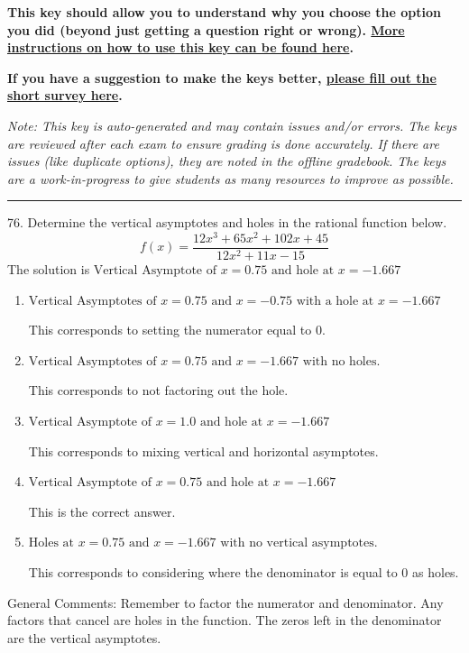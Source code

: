 \documentclass{extbook}[14pt]
\begin{document}
\textbf{This key should allow you to understand why you choose the option you did (beyond just getting a question right or wrong). \href{https://xronos.clas.ufl.edu/mac1105spring2020/courseDescriptionAndMisc/Exams/LearningFromResults}{More instructions on how to use this key can be found here}.}

\textbf{If you have a suggestion to make the keys better, \href{https://forms.gle/CZkbZmPbC9XALEE88}{please fill out the short survey here}.}

\textit{Note: This key is auto-generated and may contain issues and/or errors. The keys are reviewed after each exam to ensure grading is done accurately. If there are issues (like duplicate options), they are noted in the offline gradebook. The keys are a work-in-progress to give students as many resources to improve as possible.}

\rule{\textwidth}{0.4pt}

76. Determine the vertical asymptotes and holes in the rational function below.
\[ f(x) = \frac{12x^{3} +65 x^{2} +102 x + 45}{12x^{2} +11 x -15} \] 
The solution is $ \text{Vertical Asymptote of } x = 0.75 \text{ and hole at } x = -1.667 $ 

\begin{enumerate}[label=\Alph*.] 
\item $ \text{Vertical Asymptotes of } x = 0.75 \text{ and } x = -0.75 \text{ with a hole at } x = -1.667 $ 

 This corresponds to setting the numerator equal to 0. 
\item $ \text{Vertical Asymptotes of } x = 0.75 \text{ and } x = -1.667 \text{ with no holes.} $ 

 This corresponds to not factoring out the hole. 
\item $ \text{Vertical Asymptote of } x = 1.0 \text{ and hole at } x = -1.667 $ 

 This corresponds to mixing vertical and horizontal asymptotes. 
\item $ \text{Vertical Asymptote of } x = 0.75 \text{ and hole at } x = -1.667 $ 

 This is the correct answer. 
\item $ \text{Holes at } x = 0.75 \text{ and } x = -1.667 \text{ with no vertical asymptotes.} $ 

 This corresponds to considering where the denominator is equal to 0 as holes. 
\end{enumerate} 
 
General Comments: Remember to factor the numerator and denominator. Any factors that cancel are holes in the function. The zeros left in the denominator are the vertical asymptotes.
\end{document}
